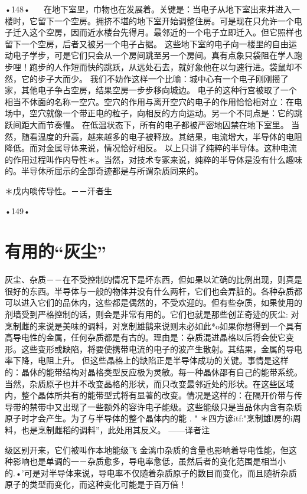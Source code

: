 {•148•
  
在地下室里，巾物也在发展着。关键是：当电子从地下室出来并进入一楼时，它留下一个空房。拥挤不堪的地下室开始调整住房。可是现在只允许一个电子迁入这个空房，因而近水楼台先得月。最邻近的一个电子立即迁入。但它照样也留下一个空房，后者又被另一个电子占据。
这些地下室的电子向一楼里的自由运动电子学步，可是它们只会从一个房间跳至另一个房间。真有点象只袋阻在学人跑步哩！跑步的人作短而快的跳跃，从远处石去，就好象他在以匀速行进。袋鼠却不然，它的步子大而少。
我们不妨作这样一个比喻：城中心有一个电子刚刚攒了家，其他电子争占空房，结果空房一步步移向城边。
电子的这种行宫被取了一个相当不休面的名称一空穴。空穴的作用与离开空穴的电子的作用恰恰相对立：在电场中，空穴就像一个带正电的粒子，向相反的方向运动。另一个不同点是：它的跳跃间距大而节奏慢。
在低温状态下，所有的电子都被严密地囚禁在地下室里。
当然，随看温度的升高，越来越多的电子被释放。其结果，电流增大，半导体的电阻降低。而对金属导体来说，情况恰好相反。
以上只讲了纯粹的半导体。这种电流的作用过程叫作内导性＊。当然，对技术专冢来说，纯粹的半导体是没有什么趣味的。半导休所屈示的全部奇迹都是与所谓杂质同来的。

＊戊内啖传导性。－－汗者生

•149•
  
\section{有用的“灰尘”}

灰尘、杂质－－在不受控制的情况下是坏东西，但如果以汒确的比例出现，则真是很好的东西。半导体与一般的物体并没有什么两杆，它们也会弄脏的。各种杂质都可以进入它们的品休内，这些都是偶然的，不受欢迎的。但有些杂质，如果使用的剂墙受到严格控制的话，则会是非常有用的。它们也就是那些创芷奇迹的灰尘:
对烹制雌的来说是美味的调料，对烹制雄鹅来说则未必如此*o如果你想得到一个具有高导电性的金属，任何杂质都是有古的。理由是：杂质混进晶格以后将会使它变形。这些变形或缺陷，将要使携带电流的电子的波产生散射。其结果，金属的导电率下降，电阻上升。
但这些晶格上的缺陷正是半导体成功的关键。事情是这样的：晶休的能带结构对晶格类型反应极为灵敏。每一种晶休邵有自己的能带系统。
当然，杂质原子也并不改变晶格的形状，而只改变最邻近处的形状。在这些区域内，整个晶体所共有的能带型式将有显著的改变。情况是这样的：在隔开价带与传导带的禁带中又出现了一些额外的容许电子能级。这些能级只是当品休内含有杂质原子时才会产生。为了与半导体的整个晶体内的能
	.	"
＊四方谚itf:"烹制雄l房的i周料，也是烹制雌稻的调料”，此处用其反义。
——译者注

级区别开来，它们被叫作本地能级飞
金漓巾杂质的含量也影响着导电性能，但这种影响也是单调的一－杂质愈多，导电率愈低，虽然后者的变化范围是相当小的.•'可是对半导体来说，导电率不仅随着杂质原子的数目而变化，而且随祈杂质原子的类型而变化，而这种变化可能是于百万倍！

}
